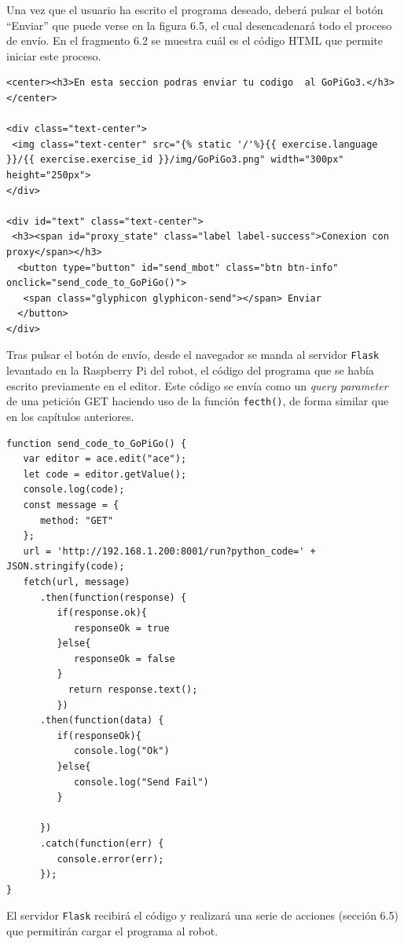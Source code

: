 \documentclass{report}
\begin{document}
Una vez que el usuario ha escrito el programa deseado, deberá pulsar el botón “Enviar” que puede verse en la figura 6.5, el cual desencadenará todo el proceso de envío. En el fragmento 6.2 se muestra cuál es el código HTML que permite iniciar este proceso.
\\
\begin{lstlisting}[frame=single,breaklines=true, label=Sección para el envío, caption=Sección para el envío,  captionpos=b]
<center><h3>En esta seccion podras enviar tu codigo  al GoPiGo3.</h3></center>

<div class="text-center">
 <img class="text-center" src="{% static '/'%}{{ exercise.language }}/{{ exercise.exercise_id }}/img/GoPiGo3.png" width="300px" height="250px">
</div>

<div id="text" class="text-center">
 <h3><span id="proxy_state" class="label label-success">Conexion con proxy</span></h3>
  <button type="button" id="send_mbot" class="btn btn-info" onclick="send_code_to_GoPiGo()">
   <span class="glyphicon glyphicon-send"></span> Enviar
  </button>
</div>
\end{lstlisting}
Tras pulsar el botón de envío, desde el navegador se manda al servidor \texttt{Flask} levantado en la Raspberry Pi del robot, el código del programa que se había escrito previamente en el editor. Este código se envía como un \textit{query parameter} de una petición GET haciendo uso de la función \texttt{fecth()}, de forma similar que en los capítulos anteriores.
\\
\begin{lstlisting}[frame=single,breaklines=true, label=Función de envío del código al servidor del GopiGo3, caption=Función de envío del código al servidor del GopiGo3,  captionpos=b]
function send_code_to_GoPiGo() {
   var editor = ace.edit("ace");
   let code = editor.getValue();
   console.log(code);
   const message = {
      method: "GET"
   };
   url = 'http://192.168.1.200:8001/run?python_code=' + JSON.stringify(code);
   fetch(url, message)
      .then(function(response) {
         if(response.ok){
            responseOk = true
         }else{
            responseOk = false
         }
           return response.text();
         })
      .then(function(data) {
         if(responseOk){
            console.log("Ok")
         }else{
            console.log("Send Fail")
         }

      })
      .catch(function(err) {
         console.error(err);
      });
}
\end{lstlisting}
El servidor \texttt{Flask} recibirá el código y realizará una serie de acciones (sección 6.5) que permitirán cargar el programa al robot.
\end{document}
